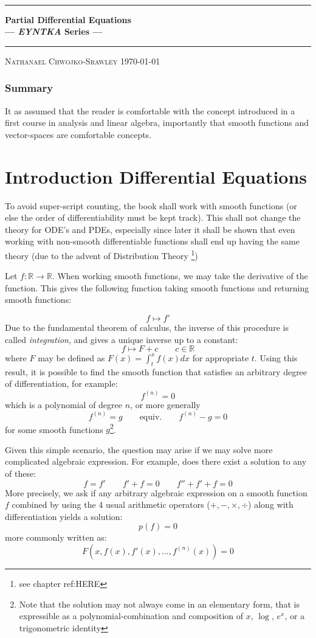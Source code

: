 \documentclass{book}
\def\title{Partial Differential Equations}
\def\author{Nathanael Chwojko-Srawley}
\newlength{\drop}%
\newcommand*{\plogo}{\fbox{$\mathcal{PL}$}}
\newcommand{\titleUL}{\begingroup%
\drop=0.1\textheight
\vspace*{\drop}
\begin{center}
{\LARGE {\quad}}\\[\drop]

\rule{\textwidth}{1pt}\par
\vspace{0.5\baselineskip}
{\huge\bfseries \title\\[0.2\baselineskip]
\large --- \emph{EYNTKA} Series ---}\\[0.5\baselineskip]
\rule{\textwidth}{1pt}\par
\vfill
{\Large\textsc{\author}}
\vfill
\vfill
{\large \today}
\end{center}
\endgroup}
\newcommand{\R}{{\mathbb{R}}}
\begin{document}
\titleUL
\tableofcontents

\subsection*{Summary}

It as assumed that the reader is comfortable with the concept introduced in a first course in analysis and
linear algebra, importantly that smooth functions and vector-spaces are comfortable concepts.

\chapter*{Introduction Differential Equations}

To avoid super-script counting, the book shall work with smooth functions (or else the order of
differentiability must be kept track). This shall not change the theory for ODE's and PDEs, especially since
later it shall be shown that even working with non-smooth differentiable functions shall end up having the
same theory (due to the advent of Distribution Theory \footnote{see chapter ref:HERE})

Let $f : \R \to \R$. When working smooth functions, we may take the derivative
of the function. This gives the following function taking smooth functions and returning smooth functions:

\[
	f \mapsto f'
\]
Due to the fundamental theorem of calculus, the inverse of this procedure is called \emph{integration}, and gives a unique inverse up to a constant:
\[
	f \mapsto F + c \qquad c \in \R
\]
where $F$ may be defined as $F(x) = \int_t^x f(x)dx$ for appropriate $t$. Using this result, it is possible
to find the smooth function that satisfies an arbitrary degree of differentiation, for example:
\[
	f^{(n)} = 0
\]
which is a polynomial of degree $n$, or more generally
\[
	f^{(n)} = g \qquad \text{equiv.} \qquad f^{(n)} - g = 0
\]
for some smooth functions $g$\footnote{Note that the solution may not always come in an elementary form, that
is expressible as a polynomial-combination and composition of $x$, $\log$, $e^x$, or a trigonometric
identity}.


Given this simple scenario, the question may arise if we may solve more
complicated algebraic expression. For example, does there exist a solution to any of these:
\[
	f = f'\qquad f' + f = 0\qquad f'' + f' + f = 0
\]
More precisely, we ask if any arbitrary algebraic expression on a smooth function $f$ combined by using the 4 usual arithmetic operators
($+,-,\times,\div$) along with differentiation yields a solution:
\[
	p(f) = 0
\]
more commonly written as:
\[
	F(x, f(x), f'(x), ..., f^{(n)}(x)) = 0
\]
\end{document}
